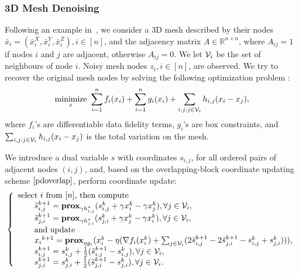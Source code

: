 \subsubsection{3D Mesh Denoising}
Following an example in~\cite{repetti2015random}, we consider a 3D mesh described by their nodes $\bar{x}_i=(\bar{x}_i^X,\bar{x}_i^Y,\bar{x}_i^Z), i\in[n]$, and the adjacency matrix $A\in\mathbb{R}^{n\times n}$, where $A_{ij} = 1$ if nodes $i$ and $j$ are adjacent, otherwise $A_{ij} = 0$. We let ${\mathcal{V}}_i$  be the set of neighbours of node $i$. Noisy mesh nodes $z_i, i \in [n]$, are observed. We try to recover the original mesh nodes by solving the following optimization problem \cite{repetti2015random}:
\begin{equation}
\Min_{x} ~\sum_{i=1}^n f_i(x_i)+\sum_{i=1}^n g_i(x_i)+\sum_{i,j:j\in \cV_{i}} h_{i,j}(x_{i}-x_{j}),
\end{equation}
where $f_i$'s are differentiable data fidelity terms, $g_i$'s are box constraints, and $\sum_{i,j:j\in {\mathcal{V}}_{i}} h_{i,j}(x_{i}-x_{j})$ is the total variation on the mesh.

We introduce a dual variable $s$ with coordinates $s_{i,j}$, for all ordered pairs of adjacent nodes $(i,j)$, and, based on the overlapping-block coordinate updating scheme $\eqref{pdoverlap}$, perform coordinate update:
\begin{equation}
\left\{
\begin{array}{l}
\text{select $i$ from $[n]$, then compute }\\
\qquad \tilde{s}_{i,j}^{k+1}=\prox_{\gamma h_{i,j}^*} (s_{i,j}^k+\gamma x_i^k-\gamma x_j^k),\forall j\in\cV_i,\\
\qquad \tilde{s}_{j,i}^{k+1}=\prox_{\gamma h_{j,i}^*} (s_{j,i}^k+\gamma x_j^k-\gamma x_i^k),\forall j\in\cV_i,\\
\qquad \textnormal{and update}\\
\qquad {x_i}^{k+1}=\prox_{\eta g_i}(x_i^k-\eta(\nabla f_i(x_i^k)+\sum_{j\in\cV_i}(2\tilde{s}_{i,j}^{k+1}-2\tilde{s}_{j,i}^{k+1}-s_{i,j}^k+{s}_{j,i}^{k}))),\\
\qquad s_{i,j}^{k+1}=s_{i,j}^k+\frac{1}{2}(\tilde{s}_{i,j}^{k+1}-s_{i,j}^k),\forall j\in\cV_i,\\
\qquad s_{j,i}^{k+1}=s_{j,i}^k+\frac{1}{2}(\tilde{s}_{j,i}^{k+1}-s_{j,i}^k),\forall j\in\cV_i.
\end{array}
\right.\nonumber
\end{equation}
